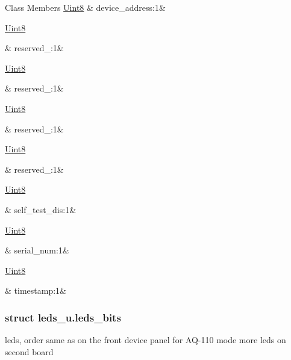 \begin{DoxyFields}{Class Members}
\hypertarget{a00001_aa8fac2617198b520dfc114ba0723bc91}{\hyperlink{a00001_a979e3e23b9a449e69ab6a8a83b6042f8}{Uint8}}\label{a00001_aa8fac2617198b520dfc114ba0723bc91}
&
device\+\_\+address\+:1&
\\
\hline

\hypertarget{a00001_ae06b1a0da476564ce23eacaa5c483267}{\hyperlink{a00001_a979e3e23b9a449e69ab6a8a83b6042f8}{Uint8}}\label{a00001_ae06b1a0da476564ce23eacaa5c483267}
&
reserved\+\_\+:1&
\\
\hline

\hypertarget{a00001_a856296a615f82bae3ba194ba5e8ebc81}{\hyperlink{a00001_a979e3e23b9a449e69ab6a8a83b6042f8}{Uint8}}\label{a00001_a856296a615f82bae3ba194ba5e8ebc81}
&
reserved\+\_\+:1&
\\
\hline

\hypertarget{a00001_a68dcb72399781293a002bb986ffc83f2}{\hyperlink{a00001_a979e3e23b9a449e69ab6a8a83b6042f8}{Uint8}}\label{a00001_a68dcb72399781293a002bb986ffc83f2}
&
reserved\+\_\+:1&
\\
\hline

\hypertarget{a00001_ace10d7baf718c25610556c65020657dd}{\hyperlink{a00001_a979e3e23b9a449e69ab6a8a83b6042f8}{Uint8}}\label{a00001_ace10d7baf718c25610556c65020657dd}
&
reserved\+\_\+:1&
\\
\hline

\hypertarget{a00001_a303e1d1a8026f5f5c1a74e1766d673c9}{\hyperlink{a00001_a979e3e23b9a449e69ab6a8a83b6042f8}{Uint8}}\label{a00001_a303e1d1a8026f5f5c1a74e1766d673c9}
&
self\+\_\+test\+\_\+dis\+:1&
\\
\hline

\hypertarget{a00001_af2987f1c7f6effac7eb91bf4af49870b}{\hyperlink{a00001_a979e3e23b9a449e69ab6a8a83b6042f8}{Uint8}}\label{a00001_af2987f1c7f6effac7eb91bf4af49870b}
&
serial\+\_\+num\+:1&
\\
\hline

\hypertarget{a00001_ad7e6d55ba379a13d08c25d15faf2a23b}{\hyperlink{a00001_a979e3e23b9a449e69ab6a8a83b6042f8}{Uint8}}\label{a00001_ad7e6d55ba379a13d08c25d15faf2a23b}
&
timestamp\+:1&
\\
\hline

\end{DoxyFields}
\label{df/d13/a00085}
\hypertarget{a00001_df/d13/a00085}{}
\subsubsection{struct leds\+\_\+u.\+leds\+\_\+bits}
leds, order same as on the front device panel for A\+Q-\/110 mode more leds on second board 

